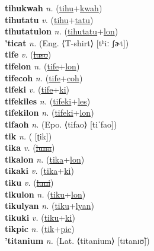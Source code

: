 \textbf{tihukwah} \textit{n.} (\hyperref[tihu]{tihu}+\hyperref[kwah]{kwah})
 \label{tihukwah} \\
\textbf{tihutatu} \textit{v.} (\hyperref[tihu]{tihu}+\hyperref[tatu]{tatu})
 \label{tihutatu} \\
\textbf{tihutatulon} \textit{n.} (\hyperref[tihutatu]{tihutatu}+\hyperref[lon]{lon})
 \label{tihutatulon} \\
\textbf{'ticat} \textit{n.} (Eng. ⟨T-shirt⟩ [tʰiː ʃɚt])
 \label{'ticat} \\
\textbf{tife} \textit{v.} (\hyperref[luso]{\sout{luso}})
 \label{tife} \\
\textbf{tifelon} \textit{n.} (\hyperref[tife]{tife}+\hyperref[lon]{lon})
 \label{tifelon} \\
\textbf{tifecoh} \textit{n.} (\hyperref[tife]{tife}+\hyperref[coh]{coh})
 \label{tifecoh} \\
\textbf{tifeki} \textit{v.} (\hyperref[tife]{tife}+\hyperref[ki]{ki})
 \label{tifeki} \\
\textbf{tifekiles} \textit{n.} (\hyperref[tifeki]{tifeki}+\hyperref[les]{les})
 \label{tifekiles} \\
\textbf{tifekilon} \textit{n.} (\hyperref[tifeki]{tifeki}+\hyperref[lon]{lon})
 \label{tifekilon} \\
\textbf{tifaoh} \textit{n.} (Epo. ⟨tifao⟩ [tiˈfao])
 \label{tifaoh} \\
\textbf{tik} \textit{n.} ( [ʈik])
 \label{tik} \\
\textbf{tika} \textit{v.} (\hyperref[luna]{\sout{luna}})
 \label{tika} \\
\textbf{tikalon} \textit{n.} (\hyperref[tika]{tika}+\hyperref[lon]{lon})
 \label{tikalon} \\
\textbf{tikaki} \textit{v.} (\hyperref[tika]{tika}+\hyperref[ki]{ki})
 \label{tikaki} \\
\textbf{tiku} \textit{v.} (\hyperref[luni]{\sout{luni}})
 \label{tiku} \\
\textbf{tikulon} \textit{n.} (\hyperref[tiku]{tiku}+\hyperref[lon]{lon})
 \label{tikulon} \\
\textbf{tikulyan} \textit{n.} (\hyperref[tiku]{tiku}+\hyperref[lyan]{lyan})
 \label{tikulyan} \\
\textbf{tikuki} \textit{v.} (\hyperref[tiku]{tiku}+\hyperref[ki]{ki})
 \label{tikuki} \\
\textbf{tikpic} \textit{n.} (\hyperref[tik]{tik}+\hyperref[pic]{pic})
 \label{tikpic} \\
\textbf{'titanium} \textit{n.} (Lat. ⟨titanium⟩ [tɪtanɪʊ̃])

